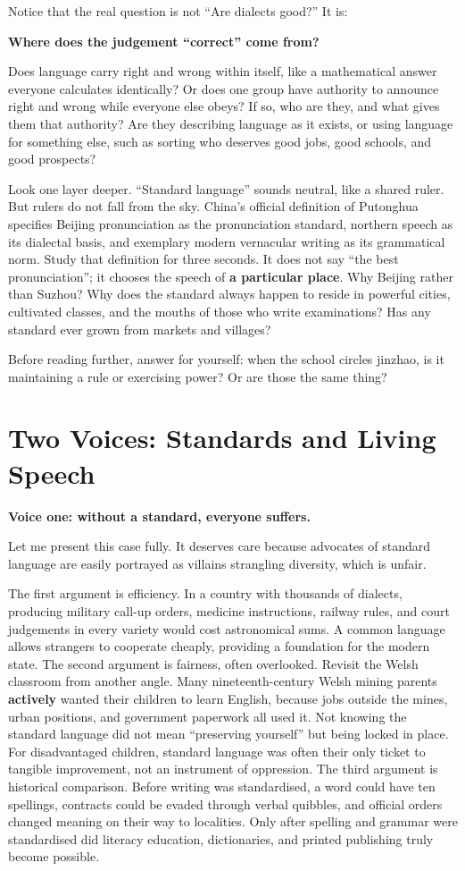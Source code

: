 Notice that the real question is not ``Are dialects good?'' It is:

\textbf{Where does the judgement ``correct'' come from?}

Does language carry right and wrong within itself, like a mathematical answer everyone calculates identically? Or does one group have authority to announce right and wrong while everyone else obeys? If so, who are they, and what gives them that authority? Are they describing language as it exists, or using language for something else, such as sorting who deserves good jobs, good schools, and good prospects?

Look one layer deeper. ``Standard language'' sounds neutral, like a shared ruler. But rulers do not fall from the sky. China's official definition of Putonghua specifies Beijing pronunciation as the pronunciation standard, northern speech as its dialectal basis, and exemplary modern vernacular writing as its grammatical norm. Study that definition for three seconds. It does not say ``the best pronunciation''; it chooses the speech of \textbf{a particular place}. Why Beijing rather than Suzhou? Why does the standard always happen to reside in powerful cities, cultivated classes, and the mouths of those who write examinations? Has any standard ever grown from markets and villages?

Before reading further, answer for yourself: when the school circles jinzhao, is it maintaining a rule or exercising power? Or are those the same thing?

\section{Two Voices: Standards and Living Speech}
\textbf{Voice one: without a standard, everyone suffers.}

Let me present this case fully. It deserves care because advocates of standard language are easily portrayed as villains strangling diversity, which is unfair.

The first argument is efficiency. In a country with thousands of dialects, producing military call-up orders, medicine instructions, railway rules, and court judgements in every variety would cost astronomical sums. A common language allows strangers to cooperate cheaply, providing a foundation for the modern state. The second argument is fairness, often overlooked. Revisit the Welsh classroom from another angle. Many nineteenth-century Welsh mining parents \textbf{actively} wanted their children to learn English, because jobs outside the mines, urban positions, and government paperwork all used it. Not knowing the standard language did not mean ``preserving yourself'' but being locked in place. For disadvantaged children, standard language was often their only ticket to tangible improvement, not an instrument of oppression. The third argument is historical comparison. Before writing was standardised, a word could have ten spellings, contracts could be evaded through verbal quibbles, and official orders changed meaning on their way to localities. Only after spelling and grammar were standardised did literacy education, dictionaries, and printed publishing truly become possible.


